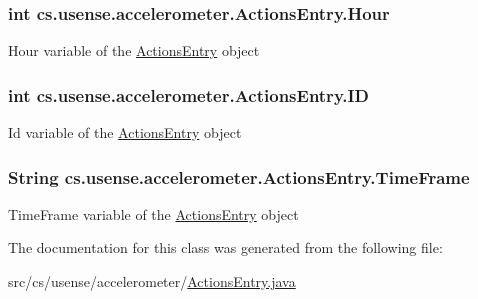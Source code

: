 \subsubsection[{Hour}]{\setlength{\rightskip}{0pt plus 5cm}int cs.\+usense.\+accelerometer.\+Actions\+Entry.\+Hour\hspace{0.3cm}{\ttfamily [private]}}\label{classcs_1_1usense_1_1accelerometer_1_1_actions_entry_aa5c1c9efc45255ade6535b7800084ed9}
Hour variable of the \hyperlink{classcs_1_1usense_1_1accelerometer_1_1_actions_entry}{Actions\+Entry} object \hypertarget{classcs_1_1usense_1_1accelerometer_1_1_actions_entry_a077d8d1b6c3e31237badfd296e015151}{}
\subsubsection[{I\+D}]{\setlength{\rightskip}{0pt plus 5cm}int cs.\+usense.\+accelerometer.\+Actions\+Entry.\+I\+D\hspace{0.3cm}{\ttfamily [private]}}\label{classcs_1_1usense_1_1accelerometer_1_1_actions_entry_a077d8d1b6c3e31237badfd296e015151}
Id variable of the \hyperlink{classcs_1_1usense_1_1accelerometer_1_1_actions_entry}{Actions\+Entry} object \hypertarget{classcs_1_1usense_1_1accelerometer_1_1_actions_entry_a484665a5c5d4a5b3ec03c134a390ebac}{}
\subsubsection[{Time\+Frame}]{\setlength{\rightskip}{0pt plus 5cm}String cs.\+usense.\+accelerometer.\+Actions\+Entry.\+Time\+Frame\hspace{0.3cm}{\ttfamily [private]}}\label{classcs_1_1usense_1_1accelerometer_1_1_actions_entry_a484665a5c5d4a5b3ec03c134a390ebac}
Time\+Frame variable of the \hyperlink{classcs_1_1usense_1_1accelerometer_1_1_actions_entry}{Actions\+Entry} object 

The documentation for this class was generated from the following file\+:\begin{DoxyCompactItemize}
\item 
src/cs/usense/accelerometer/\hyperlink{_actions_entry_8java}{Actions\+Entry.\+java}\end{DoxyCompactItemize}
